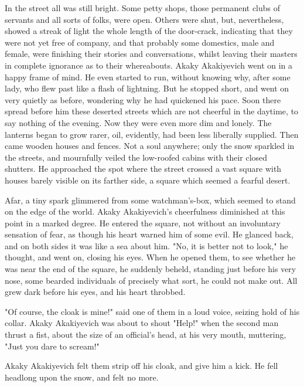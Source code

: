 In the street all was still bright. Some petty shops, those permanent
clubs of servants and all sorts of folks, were open. Others were shut,
but, nevertheless, showed a streak of light the whole length of the
door-crack, indicating that they were not yet free of company, and
that probably some domestics, male and female, were finishing their
stories and conversations, whilst leaving their masters in complete
ignorance as to their whereabouts. Akaky Akakiyevich went on in a
happy frame of mind. He even started to run, without knowing why,
after some lady, who flew past like a flash of lightning. But he
stopped short, and went on very quietly as before, wondering why he
had quickened his pace. Soon there spread before him these deserted
streets which are not cheerful in the daytime, to say nothing of the
evening. Now they were even more dim and lonely. The lanterns began to
grow rarer, oil, evidently, had been less liberally supplied. Then
came wooden houses and fences. Not a soul anywhere; only the snow
sparkled in the streets, and mournfully veiled the low-roofed cabins
with their closed shutters. He approached the spot where the street
crossed a vast square with houses barely visible on its farther side,
a square which seemed a fearful desert.

Afar, a tiny spark glimmered from some watchman's-box, which seemed to
stand on the edge of the world. Akaky Akakiyevich's cheerfulness
diminished at this point in a marked degree. He entered the square,
not without an involuntary sensation of fear, as though his heart
warned him of some evil. He glanced back, and on both sides it was
like a sea about him. "No, it is better not to look," he thought, and
went on, closing his eyes. When he opened them, to see whether he was
near the end of the square, he suddenly beheld, standing just before
his very nose, some bearded individuals of precisely what sort, he
could not make out. All grew dark before his eyes, and his heart
throbbed.

"Of course, the cloak is mine!" said one of them in a loud voice,
seizing hold of his collar. Akaky Akakiyevich was about to shout
"Help!" when the second man thrust a fist, about the size of an
official's head, at his very mouth, muttering, "Just you dare to
scream!"

Akaky Akakiyevich felt them strip off his cloak, and give him a kick.
He fell headlong upon the snow, and felt no more.

